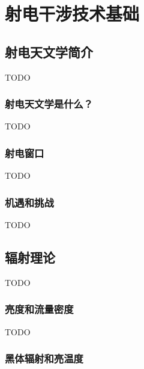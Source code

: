 \chapter{射电干涉技术基础}
\label{chap:interferometry}

\section{射电天文学简介}
\label{sec:radio-astronomy}

TODO

\subsection{射电天文学是什么？}

TODO

\subsection{射电窗口}

TODO

\subsection{机遇和挑战}

TODO


\section{辐射理论}
\label{sec:radiation}

TODO

\subsection{亮度和流量密度}

TODO

\subsection{黑体辐射和亮温度}


